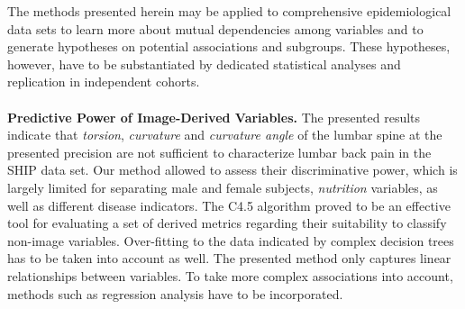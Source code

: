 \documentclass[a4paper,twoside]{style/article}
\begin{document}
The methods presented herein may be applied to comprehensive epidemiological data sets to learn more about mutual dependencies among variables and to generate hypotheses on potential associations and subgroups.
%
These hypotheses, however, have to be substantiated by dedicated statistical analyses and replication in independent cohorts.
\\\\
\noindent \textbf{Predictive Power of Image-Derived Variables.}
The presented results indicate that \emph{torsion}, \emph{curvature} and \emph{curvature angle} of the lumbar spine at the presented precision are not sufficient to characterize lumbar back pain in the SHIP data set.
Our method allowed to assess their discriminative power, which is largely limited for separating male and female subjects, \emph{nutrition} variables, as well as different disease indicators.
The C4.5 algorithm proved to be an effective tool for evaluating a set of derived metrics regarding their suitability to classify non-image variables.
Over-fitting to the data indicated by complex decision trees has to be taken into account as well.
The presented method only captures linear relationships between variables.
To take more complex associations into account, methods such as regression analysis have to be incorporated.
\\\\
\end{document}
